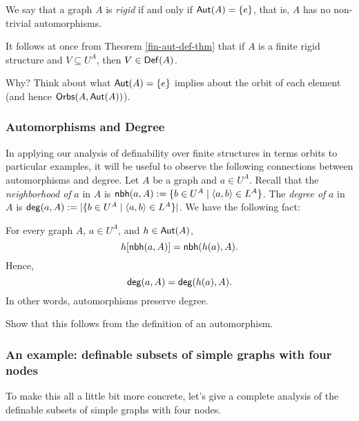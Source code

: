 \begin{definition}
    We say that a graph $A$ is \emph{rigid} if and only if $\mbox{$\mathsf{Aut}(A)$}=\{e\}$, that is, $A$ has no non-trivial automorphisms.
\end{definition}

It follows at once from Theorem \ref{fin-aut-def-thm} that if $A$ is a finite rigid structure and $V\subseteq U^A$, then $V\in\mbox{$\mathsf{Def}(A)$}$.

\begin{aside}
    Why? Think about what $\mbox{$\mathsf{Aut}(A)$}=\{e\}$ implies about the orbit of each element (and hence $\mbox{$\mathsf{Orbs}(A,\mbox{$\mathsf{Aut}(A)$})$}$). 
\end{aside}

\subsubsection*{Automorphisms and Degree}
In applying our analysis of definability over finite structures in terms orbits to particular examples, it will be useful to observe the following connections between automorphisms and degree.
Let $A$ be a graph and $a\in U^A$. Recall that the \emph{neighborhood of} $a$ in $A$ is $\mbox{$\mathsf{nbh}(a,A)$} := \{b\in U^A\mid\mbox{$\langle a,b \rangle$}\in L^A\}$. The \emph{degree of} $a$ in $A$ is $\mbox{$\mathsf{deg}(a,A)$} := \mbox{$|\{b\in U^A\mid\mbox{$\langle a,b \rangle$}\in L^A\}|$}$. We have the following fact:
\begin{proposition}
For every graph $A$, $a\in U^A$, and $h\in\mbox{$\mathsf{Aut}(A)$}$,
\[
h[\mbox{$\mathsf{nbh}(a,A)$}]=\mbox{$\mathsf{nbh}(h(a),A)$}.
\]
Hence,
\[
\mbox{$\mathsf{deg}(a,A)$} = \mbox{$\mathsf{deg}(h(a),A)$}. 
\]
In other words, automorphisms preserve degree. 
\end{proposition}

\begin{aside}
    Show that this follows from the definition of an automorphism.
\end{aside}

\subsubsection*{An example: definable subsets of simple graphs with four nodes}

To make this all a little bit more concrete, let's give a complete analysis of the definable subsets of simple graphs with four nodes. 

